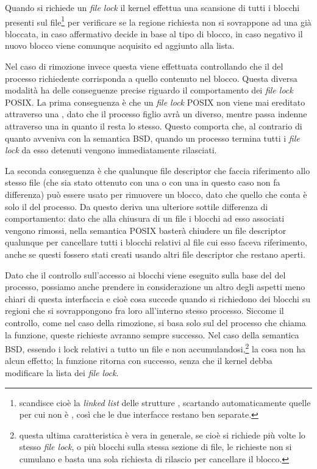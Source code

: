 Quando si richiede un \textit{file lock} il kernel effettua una scansione di
tutti i blocchi presenti sul file\footnote{scandisce cioè la \textit{linked
    list} delle strutture , scartando automaticamente
  quelle per cui  non è , così che le due
  interfacce restano ben separate.}  per verificare se la regione richiesta
non si sovrappone ad una già bloccata, in caso affermativo decide in base al
tipo di blocco, in caso negativo il nuovo blocco viene comunque acquisito ed
aggiunto alla lista.

Nel caso di rimozione invece questa viene effettuata controllando che il
 del processo richiedente corrisponda a quello contenuto nel blocco.
Questa diversa modalità ha delle conseguenze precise riguardo il comportamento
dei \textit{file lock} POSIX. La prima conseguenza è che un \textit{file lock}
POSIX non viene mai ereditato attraverso una , dato che il processo
figlio avrà un  diverso, mentre passa indenne attraverso una
 in quanto il  resta lo stesso.  Questo comporta che, al
contrario di quanto avveniva con la semantica BSD, quando un processo termina
tutti i \textit{file lock} da esso detenuti vengono immediatamente rilasciati.

La seconda conseguenza è che qualunque file descriptor che faccia riferimento
allo stesso file (che sia stato ottenuto con una  o con una
 in questo caso non fa differenza) può essere usato per rimuovere
un blocco, dato che quello che conta è solo il  del processo. Da
questo deriva una ulteriore sottile differenza di comportamento: dato che alla
chiusura di un file i blocchi ad esso associati vengono rimossi, nella
semantica POSIX basterà chiudere un file descriptor qualunque per cancellare
tutti i blocchi relativi al file cui esso faceva riferimento, anche se questi
fossero stati creati usando altri file descriptor che restano aperti.

Dato che il controllo sull'accesso ai blocchi viene eseguito sulla base del
 del processo, possiamo anche prendere in considerazione un altro
degli aspetti meno chiari di questa interfaccia e cioè cosa succede quando si
richiedono dei blocchi su regioni che si sovrappongono fra loro all'interno
stesso processo. Siccome il controllo, come nel caso della rimozione, si basa
solo sul  del processo che chiama la funzione, queste richieste
avranno sempre successo.  Nel caso della semantica BSD, essendo i lock
relativi a tutto un file e non accumulandosi,\footnote{questa ultima
  caratteristica è vera in generale, se cioè si richiede più volte lo stesso
  \textit{file lock}, o più blocchi sulla stessa sezione di file, le richieste
  non si cumulano e basta una sola richiesta di rilascio per cancellare il
  blocco.}  la cosa non ha alcun effetto; la funzione ritorna con successo,
senza che il kernel debba modificare la lista dei \textit{file lock}.

